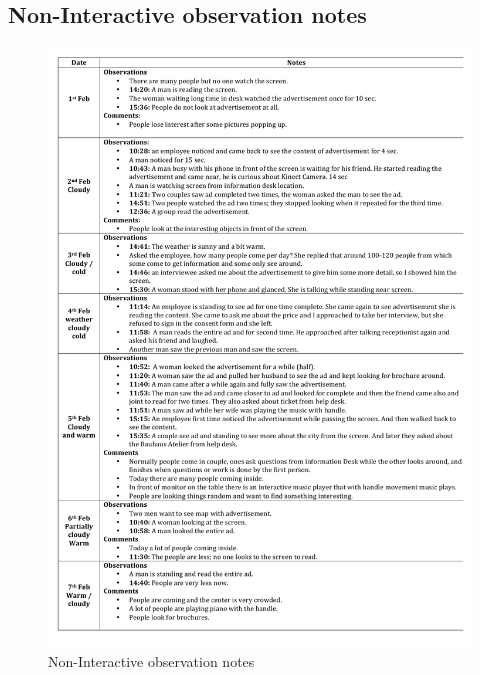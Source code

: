 \begin{appendices}
\section{Non-Interactive observation notes}
\begin{figure}[H]
 \centering 
    \includegraphics[width=\textwidth,height=0.8\textheight]{Appendices/8/non-interactive/Observation_notes.pdf}
    \caption{Non-Interactive observation notes}
     \label{app:Non-Interactiveobservation-notes}%
\end{figure}



\end{appendices}
